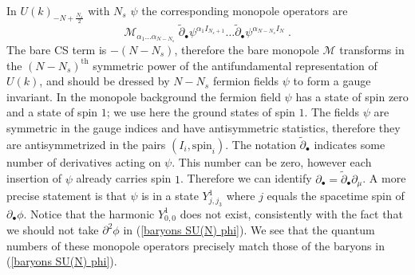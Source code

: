 \documentclass[a4paper, 12pt]{article}
\numberwithin{equation}{section}
\newcommand{\be}{\begin{equation}} \newcommand{\ee}{\end{equation}}
\newcommand{\cM}{\mathcal{M}}
\begin{document}
In $U(k)_{-N + \frac{N_s}2}$ with $N_s$ $\psi$ the corresponding monopole operators are
\be
\cM_{\alpha_1 \ldots \alpha_{N-N_s}} \; \tilde\partial_\bullet \psi^{\alpha_1 I_{N_s+1}} \ldots \tilde\partial_\bullet \psi^{\alpha_{N-N_s} I_N} \;.
\ee
The bare CS term is $-(N-N_s)$, therefore the bare monopole $\cM$ transforms in the $(N-N_s)^\text{th}$ symmetric power of the antifundamental representation of $U(k)$, and should be dressed by $N-N_s$ fermion fields $\psi$ to form a gauge invariant. In the monopole background the fermion field $\psi$ has a state of spin zero and a state of spin $1$; we use here the ground states of spin $1$. The fields $\psi$ are symmetric in the gauge indices and have antisymmetric statistics, therefore they are antisymmetrized in the pairs $(I_i, \text{spin}_i)$. The notation $\tilde\partial_\bullet$ indicates some number of derivatives acting on $\psi$. This number can be zero, however each insertion of $\psi$ already carries spin $1$. Therefore we can identify $\partial_\bullet = \tilde\partial_\bullet \partial_\mu$. A more precise statement is that $\psi$ is in a state $Y^1_{j,j_3}$ where $j$ equals the spacetime spin of $\partial_\bullet \phi$. Notice that the harmonic $Y^1_{0,0}$ does not exist, consistently with the fact that we should not take $\partial^2\phi$ in (\ref{baryons SU(N) phi}). We see that the quantum numbers of these monopole operators precisely match those of the baryons in (\ref{baryons SU(N) phi}).
\end{document}
